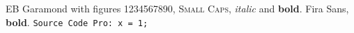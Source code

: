 \documentclass{article}
\begin{document}
EB Garamond with figures 1234567890, \textsc{Small Caps}, \textit{italic} and \textbf{bold}.
\textsf{Fira Sans, \textbf{bold}}. \texttt{Source Code Pro: x = 1;}
\end{document}
